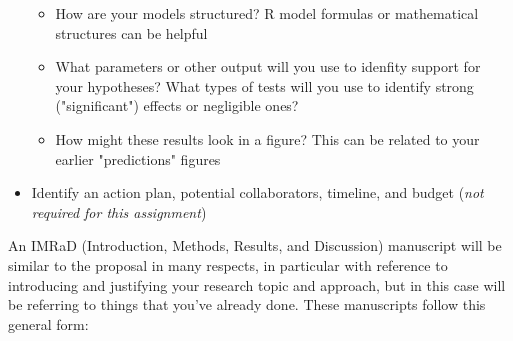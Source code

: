 \documentclass[11pt]{article}
\begin{document}
\begin{itemize}
\begin{itemize}
\begin{itemize}
    \end{itemize}
    \item How are your models structured? R model formulas or mathematical structures can be helpful
    \item What parameters or other output will you use to idenfity support for your hypotheses? What types of tests will you use to identify strong ("significant") effects or negligible ones?
    \item How might these results look in a figure? This can be related to your earlier "predictions" figures
  \end{itemize}
  \item Identify an action plan, potential collaborators, timeline, and budget (\emph{not required for this assignment})
\end{itemize}

An IMRaD (Introduction, Methods, Results, and Discussion) manuscript will be similar to the proposal in many respects, in particular with reference to introducing and justifying your research topic and approach, but in this case will be referring to things that you've already done. These manuscripts follow this general form:
\end{document}
